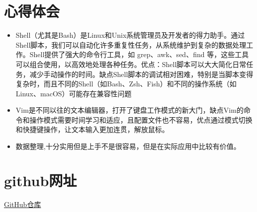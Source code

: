 \documentclass[UTF8]{ctexart}
\begin{document}
  \section{心得体会}
\begin{itemize}
  \item Shell（尤其是Bash）是Linux和Unix系统管理员及开发者的得力助手。通过Shell脚本，我们可以自动化许多重复性任务，从系统维护到复杂的数据处理工作。Shell提供了强大的命令行工具，如 grep、awk、sed、find 等，这些工具可以组合使用，以高效地处理各种任务。优点：Shell脚本可以大大简化日常任务，减少手动操作的时间。缺点Shell脚本的调试相对困难，特别是当脚本变得复杂时，而且不同的Shell（如Bash、Zsh、Fish）和不同的操作系统（如Linux、macOS）可能存在兼容性问题\\
  \item Vim是不同以往的文本编辑器，打开了键盘工作模式的新大门，缺点Vim的命令和操作模式需要时间学习和适应，且配置文件也不容易，优点通过模式切换和快捷键操作，让文本输入更加连贯，解放鼠标。
   \item 数据整理,十分实用但是上手不是很容易，但是在实际应用中比较有价值。
\end{itemize}

  

  \section{github网址}
\href{https://github.com/KeepingMoving/work1.git}{GitHub仓库}
 
\end{document}
